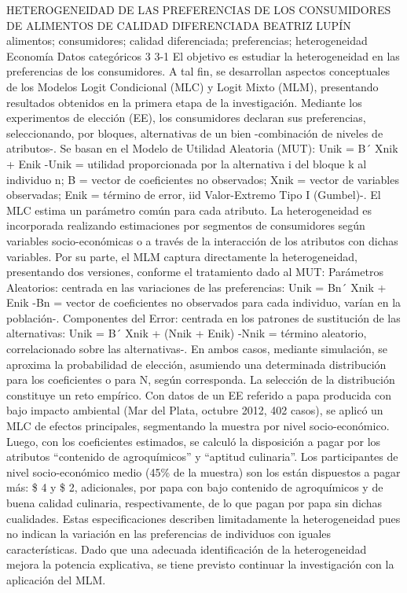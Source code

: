 \A
{HETEROGENEIDAD DE LAS PREFERENCIAS DE LOS CONSUMIDORES DE ALIMENTOS DE CALIDAD DIFERENCIADA}
{BEATRIZ LUPÍN}
{
\\
}
{alimentos; consumidores; calidad diferenciada; preferencias; heterogeneidad} 
 {Economía} 
 {Datos categóricos} 
 {3} 
 {3-1}
{El objetivo es estudiar la heterogeneidad en las preferencias de los consumidores. A tal fin, se desarrollan aspectos conceptuales de los Modelos Logit Condicional (MLC) y Logit Mixto (MLM), presentando resultados obtenidos en la primera etapa de la investigación. Mediante los experimentos de elección (EE), los consumidores declaran sus preferencias, seleccionando, por bloques, alternativas de un bien -combinación de niveles de atributos-. Se basan en el Modelo de Utilidad Aleatoria (MUT):        Unik = B´ Xnik + Enik -Unik = utilidad proporcionada por la alternativa i del bloque k al individuo n; B = vector de coeficientes no observados; Xnik = vector de variables observadas; Enik = término de error, iid Valor-Extremo Tipo I (Gumbel)-. El MLC estima un parámetro común para cada atributo. La heterogeneidad es incorporada realizando estimaciones por segmentos de consumidores según variables socio-económicas o a través de la interacción de los atributos con dichas variables. Por su parte, el MLM captura directamente la heterogeneidad, presentando dos versiones, conforme el tratamiento dado al MUT: Parámetros Aleatorios: centrada en las variaciones de las preferencias: Unik = Bn´ Xnik + Enik -Bn = vector de coeficientes no observados para cada individuo, varían en la población-. Componentes del Error: centrada en los patrones de sustitución de las alternativas: Unik = B´ Xnik + (Nnik + Enik) -Nnik = término aleatorio, correlacionado sobre las alternativas-. En ambos casos, mediante simulación, se aproxima la probabilidad de elección, asumiendo una determinada distribución para los coeficientes o para N, según corresponda. La selección de la distribución constituye un reto empírico. Con datos de un EE referido a papa producida con bajo impacto ambiental (Mar del Plata, octubre 2012, 402 casos), se aplicó un MLC de efectos principales, segmentando la muestra por nivel socio-económico. Luego, con los coeficientes estimados, se calculó la disposición a pagar por los atributos “contenido de agroquímicos” y “aptitud culinaria”. Los participantes de nivel socio-económico medio (45\% de la muestra) son los están dispuestos a pagar más: \$ 4 y \$ 2, adicionales, por papa con bajo contenido de agroquímicos y de buena calidad culinaria, respectivamente, de lo que pagan por papa sin dichas cualidades. Estas especificaciones describen limitadamente la heterogeneidad pues no indican la variación en las preferencias de individuos con iguales características. Dado que una adecuada identificación de la heterogeneidad mejora la potencia explicativa, se tiene previsto continuar la investigación con la aplicación del MLM. }
